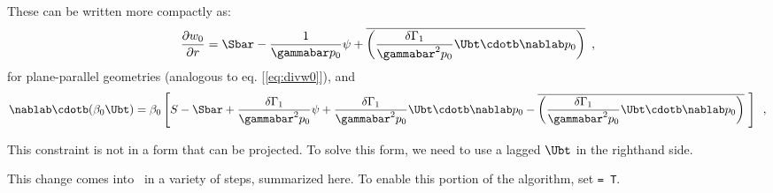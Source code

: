 These can be written more compactly as:
\begin{equation}
\frac{\partial w_0}{\partial r} = \Sbar -\frac{1}{\gammabar p_0}\psi +
\overline{ \left ( \frac{\delta \Gamma_1}{\gammabar^2 p_0} \Ubt \cdotb \nablab
  p_0 \right ) } \enskip , \label{eq:base_w0_with_dgamma1}
\end{equation}
for plane-parallel geometries (analogous to eq. [\ref{eq:divw0}]), and
\begin{equation}
\nablab \cdotb (\beta_0 \Ubt) = \beta_0 \left [ S - \Sbar + \frac{\delta
    \Gamma_1}{\gammabar^2 p_0} \psi + \frac{\delta \Gamma_1}{\gammabar^2 p_0}
  \Ubt \cdotb \nablab p_0 - \overline{ \left ( \frac{\delta
      \Gamma_1}{\gammabar^2 p_0} \Ubt \cdotb \nablab p_0 \right ) } ~ \right ]
 \enskip ,  \label{eq:constraint_with_delta_gamma}
\end{equation}

This constraint is not in a form that can be projected.  To solve this
form, we need to use a lagged $\Ubt$ in the righthand side.

This change comes into \maestro\ in a variety of steps, summarized here.
To enable this portion of the algorithm, set  {\tt = T}.


